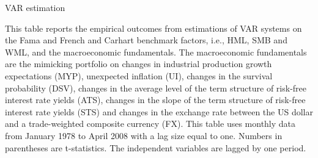 \documentclass[12pt,a4paper]{ouparticle}
\begin{document}
\begin{table}
\centering
  \begin{threeparttable}
    \caption{VAR estimation}
    
    \begin{tablenotes} 
    \small 
    \item This table reports the empirical outcomes from estimations of VAR systems on the Fama and French and Carhart benchmark factors, i.e., HML, SMB and WML, and the macroeconomic fundamentals. The macroeconomic fundamentals are the mimicking portfolio on changes in industrial production growth expectations (MYP), unexpected inflation (UI), changes in the survival probability (DSV), changes in the average level of the term structure of risk-free interest rate yields (ATS), changes in the slope of the term structure of risk-free interest rate yields (STS) and changes in the exchange rate between the US dollar and a trade-weighted composite currency (FX). This table uses monthly data from January 1978 to April 2008 with a lag size equal to one. Numbers in parentheses are t-statistics.
    The independent variables are lagged by one period.
    \end{tablenotes}
  \end{threeparttable}
\end{table}
\end{document}
